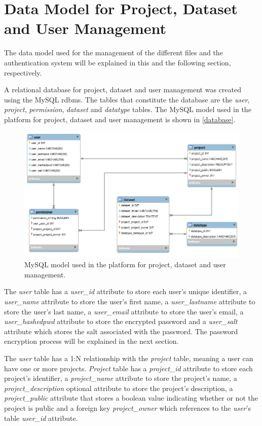 
\section{Data Model for Project, Dataset and User Management}

The data model used for the management of the different files and the authentication system will be explained in this and the following section, respectively.

A relational database for project, dataset and user management was created using the MySQL \gls{rdbms}. The tables that constitute the database are the \textit{user}, \textit{project}, \textit{permission}, \textit{dataset} and \textit{datatype} tables. The MySQL model used in the platform for project, dataset and user management is shown in \autoref{database}.

\begin{figure}[h]
	\centering
	\includegraphics[width=0.95\linewidth]{Imagens/database}
	\caption{MySQL model used in the platform for project, dataset and user management.}
	\label{database}
\end{figure}

The \textit{user} table has a \textit{user\_id} attribute to store each user's unique identifier, a \textit{user\_name} attribute to store the user's first name, a \textit{user\_lastname} attribute to store the user's last name, a \textit{user\_email} attribute to store the user's email, a \textit{user\_hashedpwd} attribute to store the encrypted password and a \textit{user\_salt} attribute which stores the salt associated with the password. The password encryption process will be explained in the next section. 

The \textit{user} table has a 1:N relationship with the \textit{project} table, meaning a user can have one or more projects. \textit{Project} table has a \textit{project\_id} attribute to store each project's identifier, a \textit{project\_name} attribute to store the project's name, a \textit{project\_description} optional attribute to store the project's description, a \textit{project\_public} attribute that stores a boolean value indicating whether or not the project is public and a foreign key \textit{project\_owner} which references to the \textit{user}'s table \textit{user\_id} attribute.

